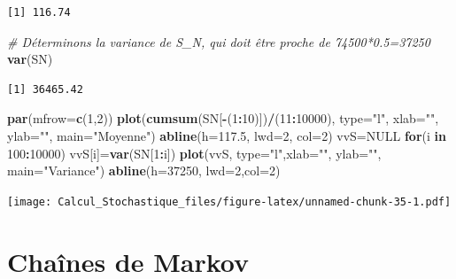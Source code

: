 \documentclass[
]{book}
\newenvironment{Shaded}{\begin{snugshade}}{\end{snugshade}}
\newcommand{\CommentTok}[1]{\textcolor[rgb]{0.56,0.35,0.01}{\textit{#1}}}
\newcommand{\ControlFlowTok}[1]{\textcolor[rgb]{0.13,0.29,0.53}{\textbf{#1}}}
\newcommand{\DataTypeTok}[1]{\textcolor[rgb]{0.13,0.29,0.53}{#1}}
\newcommand{\DecValTok}[1]{\textcolor[rgb]{0.00,0.00,0.81}{#1}}
\newcommand{\FloatTok}[1]{\textcolor[rgb]{0.00,0.00,0.81}{#1}}
\newcommand{\KeywordTok}[1]{\textcolor[rgb]{0.13,0.29,0.53}{\textbf{#1}}}
\newcommand{\NormalTok}[1]{#1}
\newcommand{\OperatorTok}[1]{\textcolor[rgb]{0.81,0.36,0.00}{\textbf{#1}}}
\newcommand{\OtherTok}[1]{\textcolor[rgb]{0.56,0.35,0.01}{#1}}
\newcommand{\StringTok}[1]{\textcolor[rgb]{0.31,0.60,0.02}{#1}}
\theoremstyle{definition}
\theoremstyle{definition}
\theoremstyle{definition}
\theoremstyle{remark}
\begin{document}
\begin{verbatim}
[1] 116.74
\end{verbatim}

\begin{Shaded}
\begin{Highlighting}[]
 \CommentTok{# Déterminons la variance de S_N,  qui doit être proche de 74500*0.5=37250}
\KeywordTok{var}\NormalTok{(SN)}
\end{Highlighting}
\end{Shaded}

\begin{verbatim}
[1] 36465.42
\end{verbatim}

\begin{Shaded}
\begin{Highlighting}[]
\KeywordTok{par}\NormalTok{(}\DataTypeTok{mfrow=}\KeywordTok{c}\NormalTok{(}\DecValTok{1}\NormalTok{,}\DecValTok{2}\NormalTok{))}
\KeywordTok{plot}\NormalTok{(}\KeywordTok{cumsum}\NormalTok{(SN[}\OperatorTok{-}\NormalTok{(}\DecValTok{1}\OperatorTok{:}\DecValTok{10}\NormalTok{)])}\OperatorTok{/}\NormalTok{(}\DecValTok{11}\OperatorTok{:}\DecValTok{10000}\NormalTok{), }\DataTypeTok{type=}\StringTok{"l"}\NormalTok{, }\DataTypeTok{xlab=}\StringTok{""}\NormalTok{, }\DataTypeTok{ylab=}\StringTok{""}\NormalTok{, }\DataTypeTok{main=}\StringTok{"Moyenne"}\NormalTok{)}
\KeywordTok{abline}\NormalTok{(}\DataTypeTok{h=}\FloatTok{117.5}\NormalTok{, }\DataTypeTok{lwd=}\DecValTok{2}\NormalTok{, }\DataTypeTok{col=}\DecValTok{2}\NormalTok{)}
\NormalTok{vvS=}\OtherTok{NULL}
\ControlFlowTok{for}\NormalTok{(i }\ControlFlowTok{in} \DecValTok{100}\OperatorTok{:}\DecValTok{10000}\NormalTok{) vvS[i]=}\KeywordTok{var}\NormalTok{(SN[}\DecValTok{1}\OperatorTok{:}\NormalTok{i])}
\KeywordTok{plot}\NormalTok{(vvS, }\DataTypeTok{type=}\StringTok{"l"}\NormalTok{,}\DataTypeTok{xlab=}\StringTok{""}\NormalTok{, }\DataTypeTok{ylab=}\StringTok{""}\NormalTok{, }\DataTypeTok{main=}\StringTok{"Variance"}\NormalTok{)}
\KeywordTok{abline}\NormalTok{(}\DataTypeTok{h=}\DecValTok{37250}\NormalTok{, }\DataTypeTok{lwd=}\DecValTok{2}\NormalTok{,}\DataTypeTok{col=}\DecValTok{2}\NormalTok{)}
\end{Highlighting}
\end{Shaded}

\texttt{[image: Calcul\_Stochastique\_files/figure-latex/unnamed-chunk-35-1.pdf]}

\hypertarget{chauxeenes-de-markov}{%
\chapter{Chaînes de Markov}\label{chauxeenes-de-markov}}
\end{document}
